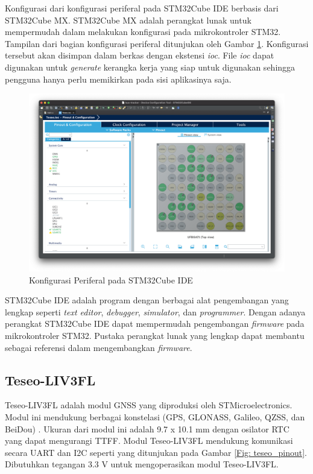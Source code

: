 Konfigurasi dari konfigurasi periferal pada STM32Cube IDE berbasis dari STM32Cube MX. STM32Cube MX adalah perangkat lunak untuk mempermudah dalam melakukan konfigurasi pada mikrokontroler STM32. Tampilan dari bagian konfigurasi periferal ditunjukan oleh Gambar \ref{Fig: stm32-mx}. Konfigurasi tersebut akan disimpan dalam berkas dengan ekstensi \textit{ioc}. File \textit{ioc} dapat digunakan untuk \textit{generate} kerangka kerja yang siap untuk digunakan sehingga pengguna hanya perlu memikirkan pada sisi aplikasinya saja.

\begin{figure}[H]
	\centering
	\includegraphics[width=12cm]{contents/chapter-2/stm32-mx.png}
	\caption{Konfigurasi Periferal pada STM32Cube IDE}
	\label{Fig: stm32-mx}
\end{figure}

STM32Cube IDE adalah program dengan berbagai alat pengembangan yang lengkap seperti \textit{text editor}, \textit{debugger}, \textit{simulator}, dan \textit{programmer}. Dengan adanya perangkat STM32Cube IDE dapat mempermudah pengembangan \textit{firmware} pada mikrokontroler STM32. Pustaka perangkat lunak yang lengkap dapat membantu sebagai referensi dalam mengembangkan \textit{firmware}.

\subsection{Teseo-LIV3FL}
Teseo-LIV3FL adalah modul GNSS yang diproduksi oleh STMicroelectronics. Modul ini mendukung berbagai konstelasi (GPS, GLONASS, Galileo, QZSS, dan BeiDou) \cite{STMicroelectronics2022}.
Ukuran dari modul ini adalah 9.7 x 10.1 mm dengan osilator RTC yang dapat mengurangi TTFF. Modul Teseo-LIV3FL mendukung komunikasi secara UART dan I2C seperti yang ditunjukan pada Gambar \ref{Fig: teseo_pinout}. Dibutuhkan tegangan 3.3 V untuk mengoperasikan modul Teseo-LIV3FL.

